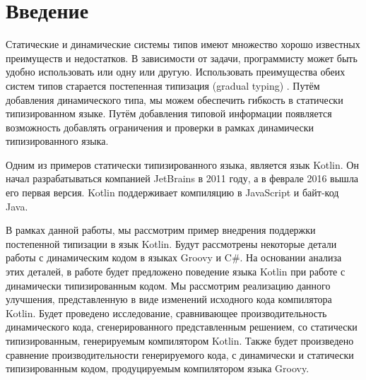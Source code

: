 \section*{Введение}

Статические и динамические системы типов имеют множество хорошо известных преимуществ и недостатков. В зависимости от задачи, программисту может быть удобно использовать или одну или другую. Использовать преимущества обеих систем типов старается постепенная типизация (gradual typing) \cite{gradual:siek2006gradual}. Путём добавления динамического типа, мы можем обеспечить гибкость в статически типизированном языке. Путём добавления типовой информации появляется возможность добавлять ограничения и проверки в рамках динамически типизированного языка.

Одним из примеров статически типизированного языка, является язык Kotlin. Он начал разрабатываться компанией JetBrains в 2011 году, а в феврале 2016 вышла его первая версия. Kotlin поддерживает компиляцию в JavaScript и байт-код Java.

В рамках данной работы, мы рассмотрим пример внедрения поддержки постепенной типизации в язык Kotlin. Будут рассмотрены некоторые детали работы с динамическим кодом в языках Groovy и C\#. На основании анализа этих деталей, в работе будет предложено поведение языка Kotlin при работе с динамически типизированным кодом. Мы рассмотрим реализацию данного улучшения, представленную в виде изменений исходного кода компилятора Kotlin. Будет проведено исследование, сравнивающее производительность динамического кода, сгенерированного представленным решением, со статически типизированным, генерируемым компилятором Kotlin. Также будет произведено сравнение производительности генерируемого кода, с динамически и статически типизированным кодом, продуцируемым компилятором языка Groovy.



